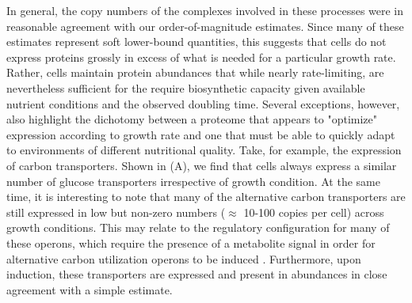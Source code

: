 In general, the copy numbers of the complexes involved in these processes were
in reasonable agreement with our order-of-magnitude estimates. Since many of
these estimates represent soft lower-bound quantities, this suggests that cells
do not express proteins grossly in excess of what is needed for a particular
growth rate. Rather, cells maintain protein abundances that while nearly
rate-limiting, are nevertheless sufficient for the require biosynthetic
capacity given available nutrient conditions and the observed doubling time.
Several exceptions, however, also highlight the dichotomy between a proteome
that appears to "optimize" expression according to growth rate and one that must
be able to quickly adapt to environments of different nutritional quality. Take,
for example, the expression of carbon transporters. Shown in
(A), we find that cells always express a similar number of
glucose transporters irrespective of growth condition. At the same time, it is
interesting to note that many of the alternative carbon transporters are still
expressed in low but non-zero numbers ($\approx$ 10-100 copies per cell) across
growth conditions. This may relate to the regulatory configuration for many of
these operons, which require the presence of a metabolite signal in order for
alternative carbon utilization operons to be induced \citep{monod1949,
laxhuber2020}. Furthermore, upon induction, these transporters are expressed and
present in abundances in close agreement with a simple estimate.


